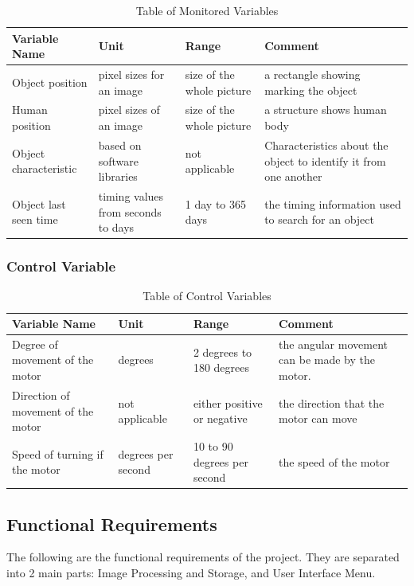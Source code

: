 \documentclass[12pt]{article}
\begin{document}
\begin{table}[H]
\caption{Table of Monitored Variables} 
\begin{tabularx}{\textwidth}{XXXX}
\toprule
\textbf{Variable Name} & \textbf{Unit} & \textbf{Range} & \textbf{Comment} \\
\midrule
Object position & pixel sizes for an image & size of the whole picture & a rectangle showing marking the object\\
Human position & pixel sizes of an image & size of the whole picture & a structure shows human body\\
Object characteristic &  based on software libraries & not applicable & Characteristics about the object to identify it from one another\\
Object last seen time & timing values from seconds to days & 1 day to 365 days & the timing information used to search for an object\\
\bottomrule
\end{tabularx}
\end{table}

\subsubsection{Control Variable}

\begin{table}[H]
\caption{Table of Control Variables} 
\begin{tabularx}{\textwidth}{XXXX}
\toprule
\textbf{Variable Name} & \textbf{Unit} & \textbf{Range} & \textbf{Comment} \\
\midrule
Degree of movement of the motor & degrees & 2 degrees to 180 degrees & the angular movement can be made by the motor.\\
Direction of movement of the motor & not applicable & either positive or negative & the direction that the motor can move\\
Speed of turning if the motor &  degrees per second & 10 to 90 degrees per second & the speed of the motor\\
\bottomrule
\end{tabularx}
\end{table}

\subsection{Functional Requirements}
The following are the functional requirements of the project. They are separated into 2 main parts: Image Processing and Storage, and User Interface Menu.
\end{document}

